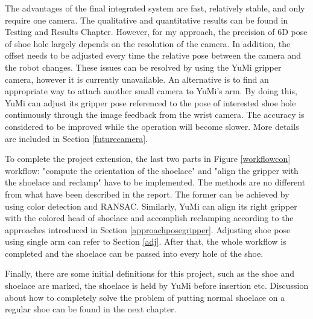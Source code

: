 The advantages of the final integrated system are fast, relatively stable, and only require one camera. The qualitative and quantitative results can be found in Testing and Results Chapter. However, for my approach, the precision of 6D pose of shoe hole largely depends on the resolution of the camera. In addition, the offset needs to be adjusted every time the relative pose between the camera and the robot changes. These issues can be resolved by using the YuMi gripper camera, however it is currently unavailable. An alternative is to find an appropriate way to attach another small camera to YuMi's arm. By doing this, YuMi can adjust its gripper pose referenced to the pose of interested shoe hole continuously through the image feedback from the wrist camera. The accuracy is considered to be improved while the operation will become slower. More details are included in Section \ref{futurecamera}.



To complete the project extension, the last two parts in Figure \ref{workflowcon} workflow: "compute the orientation of the shoelace" and "align the gripper with the shoelace and reclamp" have to be implemented. The methods are no different from what have been described in the report. The former can be achieved by using color detection and RANSAC. Similarly, YuMi can align its right gripper with the colored head of shoelace and accomplish reclamping according to the approaches introduced in Section \ref{approachposegripper}. Adjusting shoe pose using single arm can refer to Section \ref{adj}. After that, the whole workflow is completed and the shoelace can be passed into every hole of the shoe.

Finally, there are some initial definitions for this project, such as the shoe and shoelace are marked, the shoelace is held by YuMi before insertion etc. Discussion about how to completely solve the problem of putting normal shoelace on a regular shoe can be found in the next chapter. 


